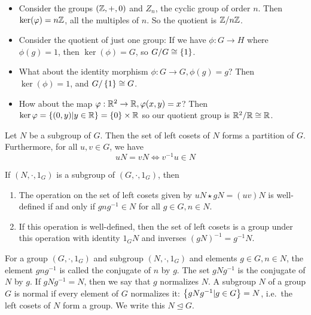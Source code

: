 \documentclass[a5paper]{article}
\begin{document}
\begin{example}
  \begin{itemize}
    \item Consider the groups $(\mathbb{Z},+,0)$ and $Z_n$, the cyclic group of order
      $n$. Then $\ker(\varphi)=n\mathbb{Z}$, all the multiples of $n$. So the quotient is
      $\mathbb{Z}/n\mathbb{Z}$.
    \item Consider the quotient of just one group:
      If we have $\phi:G\to H$ where $\phi(g)=1$, then $\ker(\phi)=G$, so
      $G/G\cong \left\{1\right\}$. 
    \item What about the identity morphism $\phi:G\to G,\phi(g)=g$? Then
      $\ker(\phi)=1$, and $G/\left\{1\right\}\cong G$.
    \item How about the map $\varphi:\mathbb{R}^2\to\mathbb{R},\varphi(x,y)=x$? Then
      $\ker{\varphi}=\left\{(0,y)|y\in\mathbb{R}\right\}=\left\{0\right\}\times\mathbb{R}$ so our quotient
      group is $\mathbb{R}^2/\mathbb{R}\cong \mathbb{R}$.
  \end{itemize}
\end{example}

\begin{lemma}
	Let $N$ be a subgroup of $G$. Then the set of left cosets of $N$ forms a
  partition of $G$. Furthermore, for all $u,v\in G$, we have
  \begin{equation*}
    uN=vN\iff v^{-1}u\in N
  \end{equation*}
\end{lemma}

\begin{lemma}
	If $(N,\cdot,1_G)$ is a subgroup of $(G,\cdot,1_G)$, then
  \begin{enumerate}%
    \item The operation on the set of left cosets given by $uN\star gN=(uv)N$ is
      well-defined if and only if $gng^{-1}\in N$ for all $g\in G,n\in N$.
    \item If this operation is well-defined, then the set of left cosets is a
      group under this operation with identity $1_GN$ and inverses
      $(gN)^{-1}=g^{-1}N$.
  \end{enumerate}
\end{lemma}

\begin{definition}
  For a group $(G,\cdot,1_G)$ and subgroup $(N,\cdot,1_G)$ and elements
  $g\in G,n\in N$, the element $gng^{-1}$ is called the conjugate of $n$ by $g$.
  The set $gNg^{-1}$ is the conjugate of $N$ by $g$. If $gNg^{-1}=N$, then we
  say that $g$ normalizes $N$. A subgroup $N$ of a group
  $G$ is normal if every element of $G$ normalizes it:
  $\left\{gNg^{-1}|g\in G\right\}=N$, i.e.\ the left cosets of $N$ form a group. We
  write this $N\trianglelefteq G$.
\end{definition}
\end{document}
